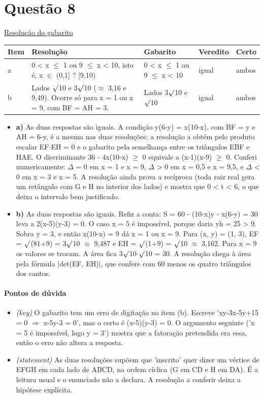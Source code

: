 \documentclass{article}%
\begin{document}
\section*{Questão 8}%
\href{https://poliedroresolve.sistemapoliedro.com.br/vestibulares/ita/2027/ita-2-fase-dia-1-20-10-2026-2-fase-dia-1/dissertativa-8-matematica-2-fase-dia-1-ita-2027}{Resolução do gabarito}\par\smallskip%
\begin{longtable}{@{}p{} p{} p{} p{} p{}@{}}\toprule Item & Resolução & Gabarito & Veredito & Certo \\ \midrule
a & 0 < x $\leq$ 1 ou 9 $\leq$ x < 10, isto é, x $\in$ (0,1{]} ? {[}9,10) & 0 < x $\leq$ 1 ou 9 $\leq$ x < 10 & igual & ambos \\
b & Lados $\surd$10 e 3$\surd$10 ($\approx$ 3,16 e 9,49). Ocorre só para x = 1 ou x = 9, com BF = AH = 3. & Lados 3$\surd$10 e $\surd$10 & igual & ambos \\
\bottomrule\end{longtable}%
\begin{itemize}%
\item%
\textbf{a)} As duas respostas são iguais. A condição y(6-y) = x(10-x), com BF = y e AH = 6-y, é a mesma nas duas resoluções: a resolução a obtém pelo produto escalar EF$\cdot$EH = 0 e o gabarito pela semelhança entre os triângulos EBF e HAE. O discriminante 36 - 4x(10-x) $\geq$ 0 equivale a (x-1)(x-9) $\geq$ 0. Conferi numericamente: $\Delta$ = 0 em x = 1 e x = 9, $\Delta$ > 0 em x = 0,5 e x = 9,5, e $\Delta$ < 0 em x = 3 e x = 5. A resolução ainda prova a recíproca (toda raiz real gera um retângulo com G e H no interior dos lados) e mostra que 0 < t < 6, o que deixa o intervalo bem justificado.%
\item%
\textbf{b)} As duas respostas são iguais. Refiz a conta: S = 60 - (10-x)y - x(6-y) = 30 leva a 2(x-5)(y-3) = 0. O caso x = 5 é impossível, porque daria yh = 25 > 9. Sobra y = 3, e então x(10-x) = 9 dá x = 1 ou x = 9. Para (x, y) = (1, 3), EF = $\surd$(81+9) = 3$\surd$10 $\approx$ 9,487 e EH = $\surd$(1+9) = $\surd$10 $\approx$ 3,162. Para x = 9 os valores se trocam. A área fica 3$\surd$10$\cdot$$\surd$10 = 30. A resolução chega à área pela fórmula |det(EF, EH)|, que confere com 60 menos os quatro triângulos dos cantos.%
\end{itemize}%
\paragraph{Pontos de dúvida}%
\begin{itemize}%
\item%
\textit{(key)} O gabarito tem um erro de digitação no item (b). Escreve 'xy-3x-5y+15 = 0 $\Rightarrow$ x-5y-3 = 0', mas o certo é (x-5)(y-3) = 0. O argumento seguinte ('x = 5 é impossível, logo y = 3') mostra que a fatoração pretendida era essa, então o erro não altera a resposta.%
\item%
\textit{(statement)} As duas resoluções supõem que 'inscrito' quer dizer um vértice de EFGH em cada lado de ABCD, na ordem cíclica (G em CD e H em DA). É a leitura usual e o enunciado não a declara. A resolução a conferir deixa a hipótese explícita.%
\end{itemize}%
\end{document}
